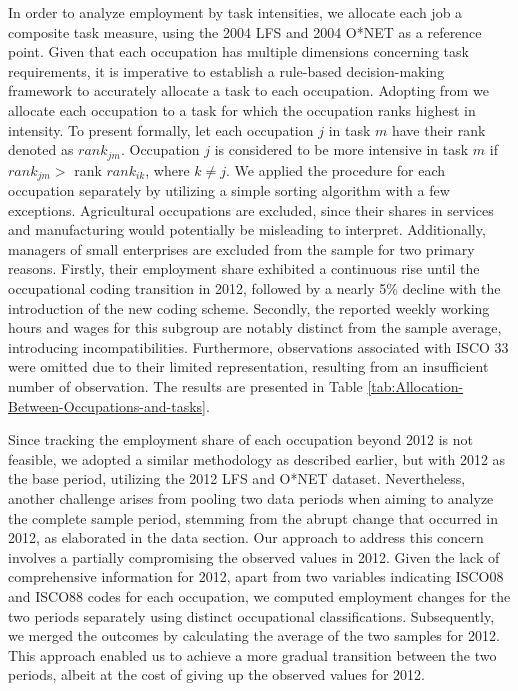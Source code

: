 \begin{onehalfspace}
In order to analyze employment by task intensities, we allocate each
job a composite task measure, using the 2004 LFS and 2004 O{*}NET
as a reference point. Given that each occupation has multiple dimensions
concerning task requirements, it is imperative to establish a rule-based
decision-making framework to accurately allocate a task to each occupation.
Adopting from \citet{2018Fonseca} we allocate each occupation to
a task for which the occupation ranks highest in intensity. To present
formally, let each occupation $j$ in task $m$ have their rank denoted
as $rank_{jm}$. Occupation $j$ is considered to be more intensive
in task $m$ if $rank_{jm}>$ rank $rank_{ik}$, where $k\neq j$.
We applied the procedure for each occupation separately by utilizing
a simple sorting algorithm with a few exceptions. Agricultural occupations
are excluded, since their shares in services and manufacturing would
potentially be misleading to interpret. Additionally, managers of
small enterprises are excluded from the sample for two primary reasons.
Firstly, their employment share exhibited a continuous rise until
the occupational coding transition in 2012, followed by a nearly 5\%
decline with the introduction of the new coding scheme. Secondly,
the reported weekly working hours and wages for this subgroup are
notably distinct from the sample average, introducing incompatibilities.
Furthermore, observations associated with ISCO 33 were omitted due
to their limited representation, resulting from an insufficient number
of observation. The results are presented in Table \ref{tab:Allocation-Between-Occupations-and-tasks}.

Since tracking the employment share of each occupation beyond 2012
is not feasible, we adopted a similar methodology as described earlier,
but with 2012 as the base period, utilizing the 2012 LFS and O{*}NET
dataset. Nevertheless, another challenge arises from pooling two data
periods when aiming to analyze the complete sample period, stemming
from the abrupt change that occurred in 2012, as elaborated in the
data section. Our approach to address this concern involves a partially
compromising the observed values in 2012. Given the lack of comprehensive
information for 2012, apart from two variables indicating ISCO08 and
ISCO88 codes for each occupation, we computed employment changes for
the two periods separately using distinct occupational classifications.
Subsequently, we merged the outcomes by calculating the average of
the two samples for 2012. This approach enabled us to achieve a more
gradual transition between the two periods, albeit at the cost of
giving up the observed values for 2012.


\end{onehalfspace}
